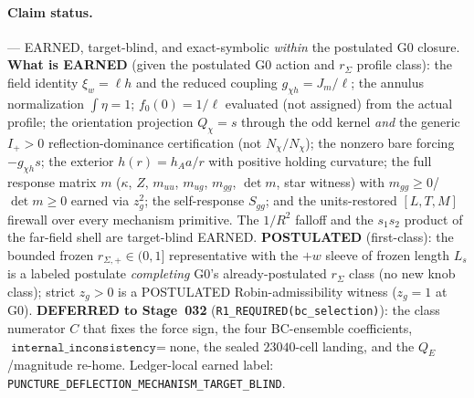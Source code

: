 \paragraph{Claim status.}
\StatusExactClosure{} --- EARNED, target-blind, and exact-symbolic \emph{within}
the postulated G0 closure. \textbf{What is EARNED} (given the postulated G0 action
and \(r_\Sigma\) profile class): the field identity \(\xi_w=\ell h\) and the
reduced coupling \(g_{\chi h}=J_m/\ell\); the annulus normalization
\(\int\eta=1\); \(f_0(0)=1/\ell\) evaluated (not assigned) from the actual
profile; the orientation projection \(Q_\chi=s\) through the odd kernel
\emph{and} the generic \(I_+>0\) reflection-dominance certification (not
\(N_\chi/N_\chi\)); the nonzero bare forcing \(-g_{\chi h}s\); the exterior
\(h(r)=h_A a/r\) with positive holding curvature; the full response matrix \(m\)
(\(\kappa\), \(Z\), \(m_{uu}\), \(m_{ug}\), \(m_{gg}\), \(\det m\), star witness)
with \(m_{gg}\ge0\)/\(\det m\ge0\) earned via \(z_g^2\); the self-response
\(S_{gg}\); and the units-restored \([L,T,M]\) firewall over every mechanism
primitive. The \(1/R^2\) falloff and the \(s_1s_2\) product of the far-field
shell are target-blind EARNED. \textbf{POSTULATED} (first-class): the bounded
frozen \(r_{\Sigma,+}\in(0,1]\) representative with the \(+w\) sleeve of frozen
length \(L_s\) is a labeled postulate \emph{completing} G0's already-postulated
\(r_\Sigma\) class (no new knob class); strict \(z_g>0\) is a POSTULATED
Robin-admissibility witness (\(z_g=1\) at G0). \textbf{DEFERRED to Stage~032}
(\texttt{R1\_REQUIRED(bc\_selection)}): the class numerator \(C\) that fixes the
force sign, the four BC-ensemble coefficients, \(\texttt{internal\_inconsistency}=\)none,
the sealed \(23040\)-cell landing, and the \(Q_E\)/magnitude re-home.
Ledger-local earned label:
\texttt{PUNCTURE\_DEFLECTION\_MECHANISM\_TARGET\_BLIND}.


